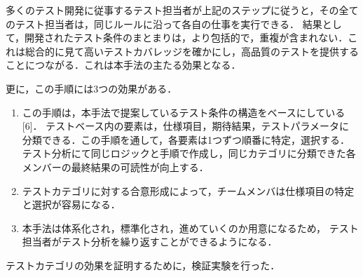 \documentclass[a4paper,12pt]{jreport}
\begin{document}
      多くのテスト開発に従事するテスト担当者が上記のステップに従うと，その全てのテスト担当者は，同じルールに沿って各自の仕事を実行できる． 結果として，開発されたテスト条件のまとまりは，より包括的で，重複が含まれない．これは総合的に見て高いテストカバレッジを確かにし，高品質のテストを提供することにつながる．これは本手法の主たる効果となる．

更に，この手順には3つの効果がある．
\begin{enumerate}
\item この手順は，本手法で提案しているテスト条件の構造をベースにしている [6]． テストベース内の要素は，仕様項目，期待結果，テストパラメータに分類できる．この手順を通して，各要素は1つずつ順番に特定，選択する． テスト分析にて同じロジックと手順で作成し，同じカテゴリに分類できた各メンバーの最終結果の可読性が向上する．
\item テストカテゴリに対する合意形成によって，チームメンバは仕様項目の特定と選択が容易になる．
\item 本手法は体系化され，標準化され，進めていくのか用意になるため， テスト担当者がテスト分析を繰り返すことができるようになる．
\end{enumerate}

テストカテゴリの効果を証明するために，検証実験を行った．
\end{document}
